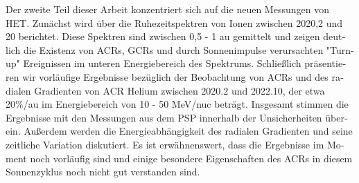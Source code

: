 \begin{otherlanguage}{ngerman}
    Der zweite Teil dieser Arbeit konzentriert sich auf die neuen Messungen von \ac{HET}. Zunächst wird über die Ruhezeitspektren von Ionen zwischen 2020,2 und 20 berichtet. Diese Spektren sind zwischen 0,5 - 1 au gemittelt und zeigen deutlich die Existenz von \acp{ACR}, \acp{GCR} und durch Sonnenimpulse verursachten "Turn-up" Ereignissen im unteren Energiebereich des Spektrums. Schließlich präsentieren wir vorläufige Ergebnisse bezüglich der Beobachtung von \acp{ACR} und des radialen Gradienten von \ac{ACR} Helium zwischen 2020.2 und 2022.10, der etwa 20\%/au im Energiebereich von 10 - 50 MeV/nuc beträgt. Insgesamt stimmen die Ergebnisse mit den Messungen aus dem \ac{PSP} innerhalb der Unsicherheiten überein. Außerdem werden die Energieabhängigkeit des radialen Gradienten und seine zeitliche Variation diskutiert. Es ist erwähnenswert, dass die Ergebnisse im Moment noch vorläufig sind und einige besondere Eigenschaften des \acp{ACR} in diesem Sonnenzyklus noch nicht gut verstanden sind.

\end{otherlanguage}